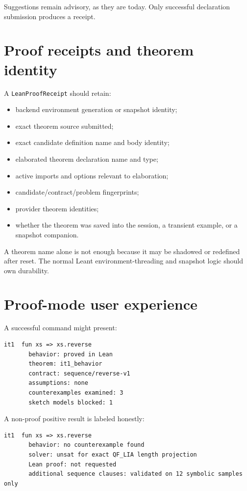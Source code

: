 \documentclass[11pt,oneside]{report}
\newcommand{\code}[1]{\texttt{#1}}
\begin{document}
Suggestions remain advisory, as they are today. Only successful declaration submission produces a receipt.

\section{Proof receipts and theorem identity}
\label{sec:proof-receipts}

A \code{LeanProofReceipt} should retain:

\begin{itemize}[leftmargin=2em]
\item backend environment generation or snapshot identity;
\item exact theorem source submitted;
\item exact candidate definition name and body identity;
\item elaborated theorem declaration name and type;
\item active imports and options relevant to elaboration;
\item candidate/contract/problem fingerprints;
\item provider theorem identities;
\item whether the theorem was saved into the session, a transient example, or a snapshot companion.
\end{itemize}

A theorem name alone is not enough because it may be shadowed or redefined after reset. The normal Leant environment-threading and snapshot logic should own durability.

\section{Proof-mode user experience}

A successful command might present:

\begin{lstlisting}[language={},caption={Illustrative proof-grade synthesis output.}]
  it1  fun xs => xs.reverse
       behavior: proved in Lean
       theorem: it1_behavior
       contract: sequence/reverse-v1
       assumptions: none
       counterexamples examined: 3
       sketch models blocked: 1
\end{lstlisting}

A non-proof positive result is labeled honestly:

\begin{lstlisting}[language={}]
  it1  fun xs => xs.reverse
       behavior: no counterexample found
       solver: unsat for exact QF_LIA length projection
       Lean proof: not requested
       additional sequence clauses: validated on 12 symbolic samples only
\end{lstlisting}
\end{document}
